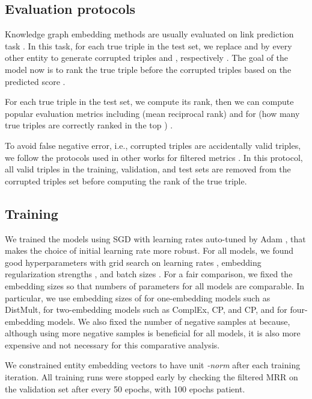\documentclass[sigconf,edbt]{acmart-edbt2019}
\begin{document}
\subsection{Evaluation protocols}
Knowledge graph embedding methods are usually evaluated on link prediction task \cite{bordes_translatingembeddingsmodeling_2013}. In this task, for each true triple  in the test set, we replace  and  by every other entity to generate corrupted triples  and , respectively \cite{bordes_translatingembeddingsmodeling_2013}. The goal of the model now is to rank the true triple  before the corrupted triples based on the predicted score .

For each true triple in the test set, we compute its rank, then we can compute popular evaluation metrics including  (mean reciprocal rank) and  for  (how many true triples are correctly ranked in the top ) \cite{trouillon_complexembeddingssimple_2016}. 

To avoid false negative error, i.e., corrupted triples are accidentally valid triples, we follow the protocols used in other works for filtered metrics \cite{bordes_translatingembeddingsmodeling_2013}. In this protocol, all valid triples in the training, validation, and test sets are removed from the corrupted triples set before computing the rank of the true triple.

\subsection{Training}
We trained the models using SGD with learning rates auto-tuned by Adam \cite{kingma_adammethodstochastic_2014}, that makes the choice of initial learning rate more robust. For all models, we found good hyperparameters with grid search on learning rates , embedding regularization strengths , and batch sizes . For a fair comparison, we fixed the embedding sizes so that numbers of parameters for all models are comparable. In particular, we use embedding sizes of  for one-embedding models such as DistMult,  for two-embedding models such as ComplEx, CP, and CP, and  for four-embedding models. We also fixed the number of negative samples at  because, although using more negative samples is beneficial for all models, it is also more expensive and not necessary for this comparative analysis.

We constrained entity embedding vectors to have unit \textit{-norm} after each training iteration. All training runs were stopped early by checking the filtered MRR on the validation set after every 50 epochs, with 100 epochs patient.
\end{document}
